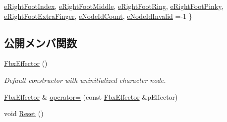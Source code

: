 \begin{DoxyCompactItemize}
\hyperlink{class_fbx_effector_a26afd81fd3d41431311004c16536e739aeb59105aa759787508c28c073a134ca4}{e\+Right\+Foot\+Index}, 
\newline
\hyperlink{class_fbx_effector_a26afd81fd3d41431311004c16536e739aa88cfdaa216c26037c7b86d317a3ad00}{e\+Right\+Foot\+Middle}, 
\hyperlink{class_fbx_effector_a26afd81fd3d41431311004c16536e739a2012e0a3430f475b895060752d89646a}{e\+Right\+Foot\+Ring}, 
\hyperlink{class_fbx_effector_a26afd81fd3d41431311004c16536e739adf3fbb5910c7d01821ba5ddf169c7dce}{e\+Right\+Foot\+Pinky}, 
\hyperlink{class_fbx_effector_a26afd81fd3d41431311004c16536e739a1804f75144f3155775ca643156fca371}{e\+Right\+Foot\+Extra\+Finger}, 
\newline
\hyperlink{class_fbx_effector_a26afd81fd3d41431311004c16536e739ac77c47b9befbabfa50286f35df67d70f}{e\+Node\+Id\+Count}, 
\hyperlink{class_fbx_effector_a26afd81fd3d41431311004c16536e739afd54cc03367f3c7365e394b009b75cf4}{e\+Node\+Id\+Invalid} =-\/1
 \}
\end{DoxyCompactItemize}
\subsection*{公開メンバ関数}
\begin{DoxyCompactItemize}
\item 
\hyperlink{class_fbx_effector_affc3f712648fd0a776886da83e562170}{Fbx\+Effector} ()
\begin{DoxyCompactList}\small\item\em Default constructor with uninitialized character node. \end{DoxyCompactList}\item 
\hyperlink{class_fbx_effector}{Fbx\+Effector} \& \hyperlink{class_fbx_effector_ac4d56e55ec719e7a8e20ac56df22ad0a}{operator=} (const \hyperlink{class_fbx_effector}{Fbx\+Effector} \&p\+Effector)
\item 
void \hyperlink{class_fbx_effector_a9361ed2afd2c90fd0a74d81467205749}{Reset} ()
\end{DoxyCompactItemize}
